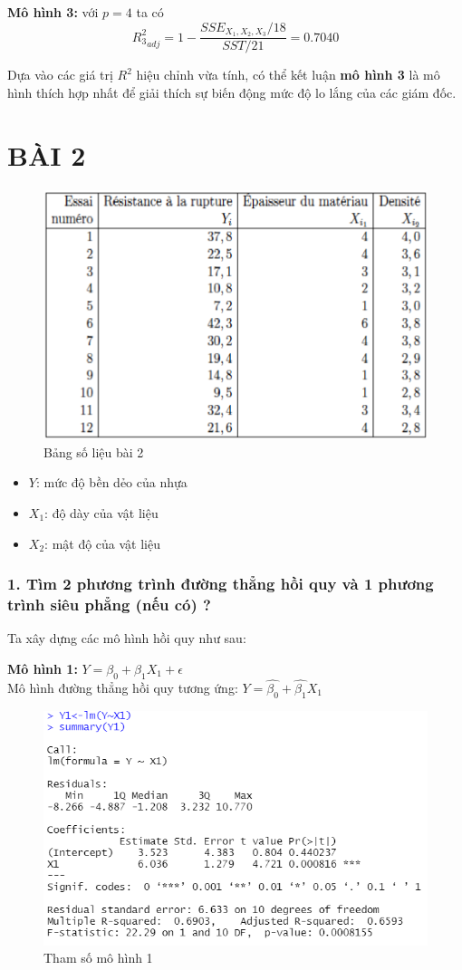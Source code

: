 \documentclass[a4paper]{article}
\theoremstyle{nonumberplain}
\begin{document}
\textbf{Mô hình 3:} với $p=4$ ta có $${R^2_3}_{adj} = 1 - \displaystyle \frac{SSE_{X_1,X_2,X_3}/18}{SST/21} = 0.7040$$

Dựa vào các giá trị $R^2$ hiệu chỉnh vừa tính, có thể kết luận \textbf{mô hình 3} là mô hình thích hợp nhất để giải thích sự biến động mức độ lo lắng của các giám đốc.
\newpage
\section*{BÀI 2}

\begin{figure}[h!]
	\centering
	\includegraphics[width=0.6\linewidth]{bai-2-data}
	\caption{Bảng số liệu bài 2}
	\label{fig:bai-2-data}
\end{figure}

\begin{itemize}
	\renewcommand\labelitemi{--}
	\item $Y$: mức độ bền dẻo của nhựa
	\item $X_1$: độ dày của vật liệu
	\item $X_2$: mật độ của vật liệu
\end{itemize}

\subsubsection*{1. Tìm 2 phương trình đường thẳng hồi quy và 1 phương trình siêu phẳng (nếu có) ?}

Ta xây dựng các mô hình hồi quy như sau:

\textbf{Mô hình 1:} $Y= \beta_0 + \beta_1 X_1 + \epsilon$\\
Mô hình đường thẳng hồi quy tương ứng: $Y= \hat{\beta_0} + \hat{\beta_1} X_1$

\begin{figure}[h!]
	\centering
	\includegraphics[scale =0.9]{bai2_1i.PNG}
	\caption{Tham số mô hình 1}
	\label{ex2:model:11}
\end{figure}
\end{document}

